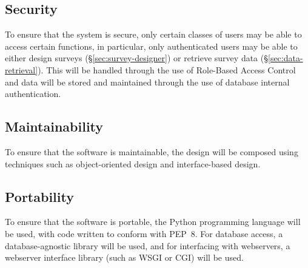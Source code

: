 \documentclass[10pt,letter]{report}
\begin{document}
\subsection{Security}
\label{sec:security}

To ensure that the system is secure, only certain classes of users may
be able to access certain functions, in particular, only authenticated
users may be able to either design surveys
(\S\ref{sec:survey-designer}) or retrieve survey data
(\S\ref{sec:data-retrieval}).  This will be handled through the use of
Role-Based Access Control and data will be stored and maintained
through the use of database internal authentication.

\subsection{Maintainability}
\label{sec:maintainability}

To ensure that the software is maintainable, the design will be
composed using techniques such as object-oriented design and
interface-based design.

\subsection{Portability}
\label{sec:portability}

To ensure that the software is portable, the Python programming
language will be used, with code written to conform with PEP~8.
For database access, a database-agnostic library will be used, and for
interfacing with webservers, a webserver interface library (such as
WSGI or CGI) will be used.

\appendix

\end{document}
